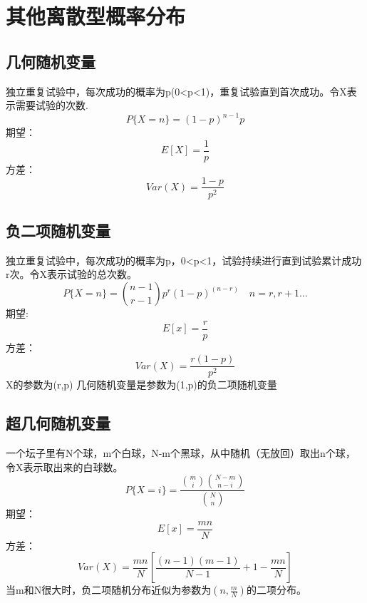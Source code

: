 \documentclass[a4paper]{book}
\begin{document}
    \section{其他离散型概率分布}
        \subsection{几何随机变量}
            独立重复试验中，每次成功的概率为p(0<p<1)，重复试验直到首次成功。令X表示需要试验的次数.
            \begin{equation*}
                P\{X = n\} = (1 - p)^{n-1}p
            \end{equation*}
        期望：
            \begin{equation*}
                E[X] = \frac{1}{p}
            \end{equation*}
        方差：
        \begin{equation*}
            Var(X) = \frac{1-p}{p^2}
        \end{equation*}

        \subsection{负二项随机变量}
        独立重复试验中，每次成功的概率为p，0<p<1，试验持续进行直到试验累计成功r次。令X表示试验的总次数。
        \begin{equation*}
            P\{ X = n \} = \binom{n-1}{r-1}p^r(1-p)^(n-r) \quad
            n = r,r+1 \dots
        \end{equation*}
        期望:
        \begin{equation*}
            E[x] = \frac{r}{p}
        \end{equation*}
        方差：
        \begin{equation*}
            Var(X) = \frac{r(1-p)}{p^2}
        \end{equation*}
        X的参数为(r,p)
        \linebreak
        几何随机变量是参数为(1,p)的负二项随机变量
    \subsection{超几何随机变量}
    一个坛子里有N个球，m个白球，N-m个黑球，从中随机（无放回）取出n个球，令X表示取出来的白球数。
    \begin{equation*}
        P\{X = i \} = \frac{\binom{m}{i}\binom{N-m}{n-i}}{\binom{N}{n}}
    \end{equation*}
    期望：
    \begin{equation*}
        E[x] = \frac{mn}{N}
    \end{equation*}
    方差：
    \begin{equation*}
        Var(X) = \frac{mn}{N}[\frac{(n-1)(m-1)}{N-1} + 1 - \frac{mn}{N}]
    \end{equation*}
    当m和N很大时，负二项随机分布近似为参数为$(n,\frac{m}{N})$的二项分布。
\end{document}
